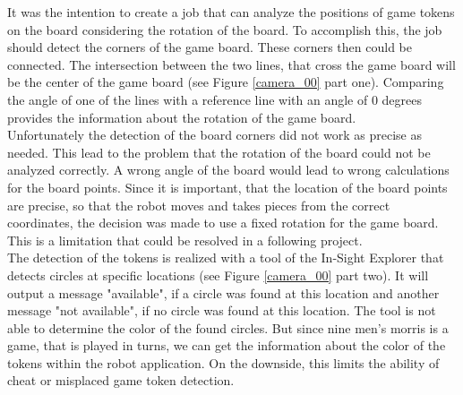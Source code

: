 \documentclass[a4paper]{spie}  %
\begin{document}
\begin{large}
It was the intention to create a job that can analyze the positions of game tokens on the board considering the rotation of the board. To accomplish this, the job should detect the corners of the game board. These corners then could be connected. The intersection between the two lines, that cross the game board will be the center of the game board (see Figure \ref{camera_00} part one). Comparing the angle of one of the lines with a reference line with an angle of 0 degrees provides the information about the rotation of the game board.\\ Unfortunately the detection of the board corners did not work as precise as needed. This lead to the problem that the rotation of the board could not be analyzed correctly. A wrong angle of the board would lead to wrong calculations for the board points. Since it is important, that the location of the board points are precise, so that the robot moves and takes pieces from the correct coordinates, the decision was made to use a fixed rotation for the game board. This is a limitation that could be resolved in a following project.\\
The detection of the tokens is realized with a tool of the In-Sight Explorer that detects circles at specific locations (see Figure \ref{camera_00} part two). It will output a message "available", if a circle was found at this location and another message "not available", if no circle was found at this location. The tool is not able to determine the color of the found circles. But since nine men's  morris is a game, that is played in turns, we can get the information about the color of the tokens within the robot application. On the downside, this limits the ability of cheat or misplaced game token detection.



\end{large}
\end{document}
